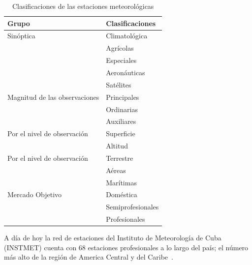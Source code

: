 \documentclass[12pt,letterpaper]{article}
\begin{document}
\begin{sloppypar}
        \begin{table}[htpb]
            \begin{tabularx}{\columnwidth}{|X|X|}
                \hline
                {\bfseries Grupo}          & {\bfseries Clasificaciones} \\
                \hline
                Sinóptica                     & Climatológica               \\
                & Agrícolas                   \\
                & Especiales                  \\
                & Aeronáuticas                \\
                & Satélites                   \\
                \hline
                Magnitud de las observaciones & Principales                 \\
                & Ordinarias                  \\
                & Auxiliares                  \\
                \hline
                Por el nivel de observación   & Superficie                  \\
                & Altitud                     \\
                \hline
                Por el nivel de observación   & Terrestre                   \\
                & Aéreas                      \\
                & Marítimas                   \\
                \hline
                Mercado Objetivo              & Doméstica                   \\
                & Semiprofesionales           \\
                & Profesionales               \\
                \hline
            \end{tabularx}
            \caption{Clasificaciones de las estaciones meteorológicas}
            \label{tab:weather_station_classification}
        \end{table}

        A día de hoy la red de estaciones del Instituto de Meteorología de Cuba
        (INSTMET) cuenta con 68 estaciones profesionales
        a lo largo del país;
        el número más alto de la región de America Central y del
        Caribe~\cite{CubaInstituteMeteorology}.


\end{sloppypar}
\end{document}
